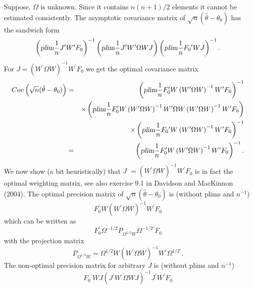 \documentclass{article}
\begin{document}
Suppose, $\Omega $ is unknown. Since it contains $n\left( n+1\right) /2$
elements it cannot be estimated consistently. The asymptotic covariance
matrix of $\sqrt{n}(\hat{\theta}-\theta _{0})$ has the sandwich form%
\begin{equation*}
\left( \textsl{plim}\frac{1}{n}J^{\prime }W^{\prime }F_{0}\right)
^{-1}\left( \textsl{plim}\frac{1}{n}J^{\prime }W^{\prime }\Omega WJ\right)
\left( \textsl{plim}\frac{1}{n}F_{0}{}^{\prime }WJ\right) ^{-1}.
\end{equation*}%
For $J=\left( W^{\prime }\Omega W\right) ^{-1}W^{\prime }F_{0}$ we get the
optimal covariance matrix%
\begin{eqnarray*}
Cov\left( \sqrt{n}(\hat{\theta}-\theta _{0})\right) &=&\left( \textsl{plim}%
\frac{1}{n}F_{0}^{\prime }W\left( W^{\prime }\Omega W\right) ^{-1}W^{\prime
}F_{0}\right) ^{-1} \\
&&\times \left( \textsl{plim}\frac{1}{n}F_{0}^{\prime }W\left( W^{\prime
}\Omega W\right) ^{-1}W^{\prime }\Omega W\left( W^{\prime }\Omega W\right)
^{-1}W^{\prime }F_{0}\right) \\
&&\times \left( \textsl{plim}\frac{1}{n}F_{0}{}^{\prime }W\left( W^{\prime
}\Omega W\right) ^{-1}W^{\prime }F_{0}\right) ^{-1} \\
&=&\left( \textsl{plim}\frac{1}{n}F_{0}^{\prime }W\left( W^{\prime }\Omega
W\right) ^{-1}W^{\prime }F_{0}\right) ^{-1}.
\end{eqnarray*}%
We now show (a bit heuristically) that $J$ $=\left( W^{\prime }\Omega
W\right) ^{-1}W^{\prime }F_{0}$ is in fact the optimal weighting matrix, see
also exercise 9.1 in Davidson and MacKinnon (2004). The optimal precision
matrix of $\sqrt{n}\left( \hat{\theta}-\theta _{0}\right) $ is (without
plims and $n^{-1}$)%
\begin{equation*}
F_{0}^{\prime }W\left( W^{\prime }\Omega W\right) ^{-1}W^{\prime }F_{0}
\end{equation*}%
which can be written as%
\begin{equation*}
F_{0}^{\prime }\Omega ^{-1/2}P_{\Omega ^{1/2}W}\Omega ^{-1/2\prime }F_{0}
\end{equation*}%
with the projection matrix%
\begin{equation*}
P_{\Omega ^{1/2}W}=\Omega ^{1/2}W\left( W^{\prime }\Omega W\right)
^{-1}W^{\prime }\Omega ^{1/2\prime }.
\end{equation*}%
The non-optimal precision matrix for arbitrary $J$ is (without plims and $%
n^{-1}$)%
\begin{equation*}
F_{0}{}^{\prime }WJ\left( J^{\prime }W^{\prime }\Omega WJ\right)
^{-1}J^{\prime }W^{\prime }F_{0}
\end{equation*}%
\end{document}
